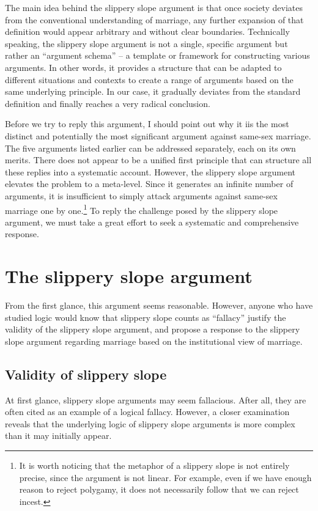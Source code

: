 \documentclass[man,floatsintext]{apa7}
\begin{document}
The main idea behind the slippery slope argument is that once society deviates from the conventional understanding of marriage, any further expansion of that definition would appear arbitrary and without clear boundaries. Technically speaking, the slippery slope argument is not a single, specific argument but rather an ``argument schema'' -- a template or framework for constructing various arguments. In other words, it provides a structure that can be adapted to different situations and contexts to create a range of arguments based on the same underlying principle. In our case, it gradually deviates from the standard definition and finally reaches a very radical conclusion.

Before we try to reply this argument, I should point out why it iis the most distinct and potentially the most significant argument against same-sex marriage. The five arguments listed earlier can be addressed separately, each on its own merits. There does not appear to be a unified first principle that can structure all these replies into a systematic account. However, the slippery slope argument elevates the problem to a meta-level. Since it generates an infinite number of arguments, it is insufficient to simply attack arguments against same-sex marriage one by one.\footnote{It is worth noticing that the metaphor of a slippery slope is not entirely precise, since the argument is not linear. For example, even if we have enough reason to reject polygamy, it does not necessarily follow that we can reject incest.} To reply the challenge posed by the slippery slope argument, we must take a great effort to seek a systematic and comprehensive response.

\section{The slippery slope argument}

From the first glance, this argument seems reasonable. However, anyone who have studied logic would know that slippery slope counts as ``fallacy'' justify the validity of the slippery slope argument, and propose a response to the slippery slope argument regarding marriage based on the institutional view of marriage.

\subsection{Validity of slippery slope}

At first glance, slippery slope arguments may seem fallacious. After all, they are often cited as an example of a logical fallacy. However, a closer examination reveals that the underlying logic of slippery slope arguments is more complex than it may initially appear.
\end{document}
